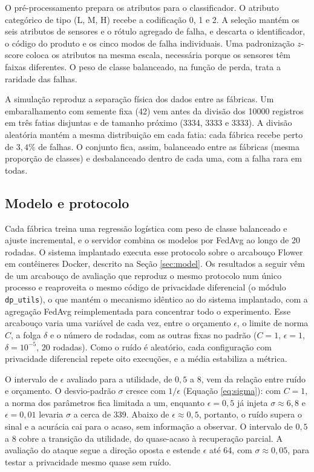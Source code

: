 \documentclass[12pt]{article}
\begin{document}
O pré-processamento prepara os atributos para o classificador. O atributo categórico de tipo (L, M, H) recebe a codificação 0, 1 e 2. A seleção mantém os seis atributos de sensores e o rótulo agregado de falha, e descarta o identificador, o código do produto e os cinco modos de falha individuais. Uma padronização $z$-score coloca os atributos na mesma escala, necessária porque os sensores têm faixas diferentes. O peso de classe balanceado, na função de perda, trata a raridade das falhas.

A simulação reproduz a separação física dos dados entre as fábricas. Um embaralhamento com semente fixa (42) vem antes da divisão dos 10000 registros em três fatias disjuntas e de tamanho próximo (3334, 3333 e 3333). A divisão aleatória mantém a mesma distribuição em cada fatia: cada fábrica recebe perto de $3{,}4\%$ de falhas. O conjunto fica, assim, balanceado entre as fábricas (mesma proporção de classes) e desbalanceado dentro de cada uma, com a falha rara em todas.

\subsection{Modelo e protocolo}

Cada fábrica treina uma regressão logística com peso de classe balanceado e ajuste
incremental, e o servidor combina os modelos por FedAvg ao longo de 20 rodadas. O
sistema implantado executa esse protocolo sobre o arcabouço Flower em contêineres Docker,
descrito na Seção \ref{sec:model}. Os resultados a seguir vêm de um arcabouço de avaliação
que reproduz o mesmo protocolo num único processo e reaproveita o mesmo código de
privacidade diferencial (o módulo \texttt{dp\_utils}), o que mantém o mecanismo idêntico ao
do sistema implantado, com a agregação FedAvg reimplementada para concentrar todo o
experimento. Esse arcabouço varia uma variável de
cada vez, entre o orçamento $\epsilon$, o limite de norma $C$, a folga $\delta$ e o número
de rodadas, com as outras fixas no padrão ($C=1$, $\epsilon=1$, $\delta=10^{-5}$,
20 rodadas). Como o ruído é aleatório, cada configuração com privacidade diferencial
repete oito execuções, e a média estabiliza a métrica.

O intervalo de $\epsilon$ avaliado para a utilidade, de $0{,}5$ a 8, vem da relação entre ruído e orçamento. O desvio-padrão $\sigma$ cresce com $1/\epsilon$ (Equação \ref{eq:sigma}): com $C=1$, a norma dos parâmetros fica limitada a um, enquanto $\epsilon=0{,}5$ já injeta $\sigma \approx 6{,}8$ e $\epsilon=0{,}01$ levaria $\sigma$ a cerca de 339. Abaixo de $\epsilon \approx 0{,}5$, portanto, o ruído supera o sinal e a acurácia cai para o acaso, sem informação a observar. O intervalo de $0{,}5$ a 8 cobre a transição da utilidade, do quase-acaso à recuperação parcial. A avaliação do ataque segue a direção oposta e estende $\epsilon$ até 64, com $\sigma \approx 0{,}05$, para testar a privacidade mesmo quase sem ruído.
\end{document}

